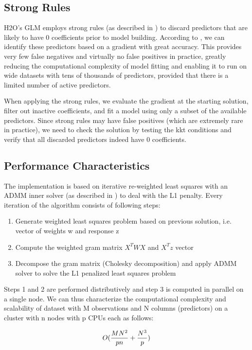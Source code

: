\documentclass{article}[11pt]
\begin{document}
\subsection{Strong Rules} %
H2O's GLM employs strong rules (as described in ) to discard predictors that are likely to have 0 coefficients prior to model building. According to , we can identify these predictors based on a gradient with great accuracy. This provides very few false negatives and virtually no false positives in practice, greatly reducing the computational complexity of model fitting and enabling it to run on wide datasets with tens of thousands of predictors, provided that there is a limited number of active predictors. 

When applying the strong rules, we evaluate the gradient at the starting solution, filter out inactive coefficients, and fit a model using only a subset of the available predictors. Since strong rules may have false positives (which are extremely rare in practice), we need to check the solution by testing the kkt conditions and verify that all discarded predictors indeed have 0 coefficients.  

\subsection{Performance Characteristics}
The implementation is based on iterative re-weighted least squares with an ADMM inner solver (as described in ) to deal with the L1 penalty. Every iteration of the algorithm consists of following steps:
\begin{enumerate} 
\item Generate weighted least squares problem based on previous solution, i.e. vector of weights w and response z 
\item Compute the weighted gram matrix $X^TWX$ and $X^Tz$ vector
\item Decompose the gram matrix (Cholesky decomposition) and apply ADMM solver to solve the L1 penalized least squares problem
\end{enumerate}

Steps 1 and 2 are performed distributively and step 3 is computed in parallel on a single node. We can thus characterize the computational complexity and scalability of dataset with M observations and N columns (predictors) on a cluster with n nodes with p CPUs each as follows:

\[ O({MN^2 \over pn} + {N^3 \over p})\]
\end{document}
